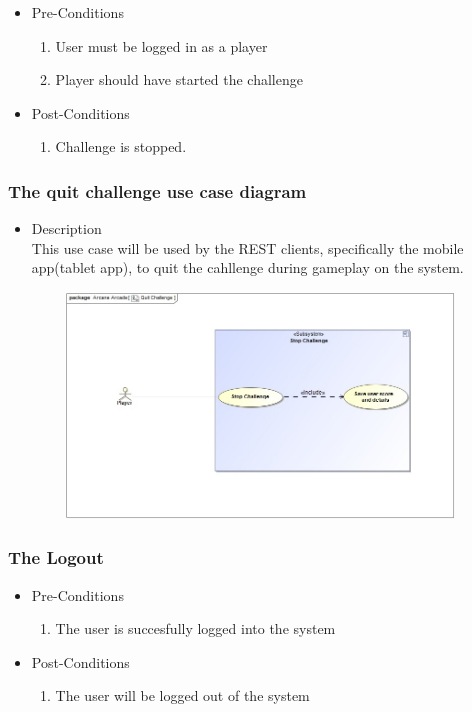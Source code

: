 \documentclass[english]{article}
\begin{document}
			\begin{itemize}
	
		
		\item Pre-Conditions
			\begin{enumerate}
				
				\item User must be logged in as a player
				\item Player should have started the challenge
			\end{enumerate}
		\item Post-Conditions
			\begin{enumerate}
			\item Challenge is stopped. 
						
			\end{enumerate}
		

		\end{itemize}
		
		
		\subsubsection* {The quit challenge use case diagram}
		\begin{itemize}
			\item Description\\
			This use case will be used by the REST clients, specifically the mobile app(tablet app), to quit the cahllenge during gameplay on the system.
		\end{itemize}	
		
		
		\includegraphics[width=14cm,height=6cm,keepaspectratio]{quitChallenge.jpg}
		
				\subsubsection{The Logout}
		\begin{itemize}
	
		
		\item Pre-Conditions
			\begin{enumerate}
				\item The user is succesfully logged into the system 
			
			\end{enumerate}
		\item Post-Conditions
			\begin{enumerate}
			\item The user will be logged out of the system
						
			\end{enumerate}
	

\end{itemize}
\end{document}
